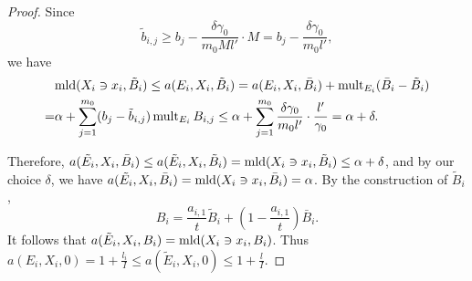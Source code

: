 \documentclass[11pt]{amsart}
\numberwithin{equation}{section}
\newcommand{\mld}{{\rm{mld}}}
\newcommand{\mult}{\operatorname{mult}}
\theoremstyle{definition}
\theoremstyle{definition}
\begin{document}
\begin{proof}
Since
$$\tilde b_{i,j}\geq b_j-\frac{\delta\gamma_0}{m_0Ml'}\cdot M=b_j-\frac{\delta\gamma_0}{m_0l'},$$
we have
\begin{align*}
&\mld(X_i\ni x_i,\tilde B_i)\leq a(E_i,X_i,\tilde B_i)=a(E_i,X_i,\bar B_i)+\mult_{E_i}(\bar B_i-\tilde B_i)\\
=&\alpha+\sum_{j=1}^{m_0}(b_j-\tilde b_{i,j})\mult_{E_i}B_{i,j}\leq \alpha+\sum_{j=1}^{m_0}\frac{\delta\gamma_0}{m_0l'}\cdot\frac{l'}{\gamma_0}=\alpha+\delta.
\end{align*}

Therefore, $a(\tilde{E_i},X_i,\bar B_i)\leq a(\tilde{E}_i,X_i,\tilde B_i)=\mld(X_i\ni x_i, \tilde{B}_i)\leq \alpha+\delta$, and by our choice $\delta$, we have $a(\tilde{E_i},X_i,\bar B_i)=\mld(X_i\ni x_i,\bar B_i)=\alpha$. By the construction of $\tilde B_i$,
$$B_i=\frac{a_{i,1}}{t}\tilde B_i+(1-\frac{a_{i,1}}{t})\bar B_i.$$
It follows that $a(\tilde E_i,X_i,B_i)=\mld(X_i\ni x_i, B_i)$. Thus $a(E_i,X_i,0)=1+\frac{l_i}{I}\le a(\tilde E_i,X_i,0)\leq 1+\frac{l}{I}$. 
\end{proof}
\end{document}
